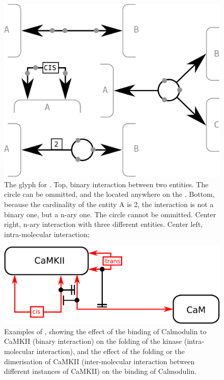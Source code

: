 \begin{figure}[H]
  \centering
  \includegraphics[scale = 0.3]{images/interaction}
  \caption{The \ER glyph for . Top, binary interaction between two entities. The circle can be ommitted, and the  located anywhere on the . Bottom, because the cardinality of the entity A is 2, the interaction is not a binary one, but a n-ary one. The circle cannot be ommitted. Center right, n-ary interaction with three different entities. Center left, intra-molecular interaction; }
  \label{fig:interaction}
\end{figure}

\begin{figure}[H]
  \centering
  \includegraphics[scale = 0.5]{examples/ex-interaction}
  \caption{Examples of , showing the effect of the binding of Calmodulin to CaMKII (binary interaction) on the folding of the kinase (intra-molecular interaction), and the effect of the folding or the dimerisation of CaMKII (inter-molecular interaction between different instances of CaMKII) on the binding of Calmodulin.}
  \label{fig:ex-interaction}
\end{figure}


\normalcolor